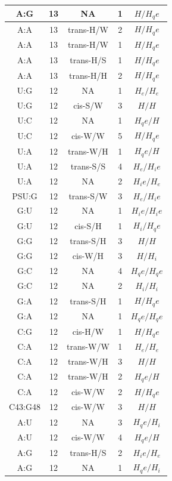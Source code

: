 \begin{center}
\begin{longtable}{c|c|c|c|c}
A:G & 13 & NA & 1 & $H/H_qe$ \\  \hline
A:A & 13 & trans-H/W & 2 & $H/H_qe$ \\  \hline
A:A & 13 & trans-H/W & 1 & $H/H_qe$ \\  \hline
A:A & 13 & trans-H/S & 1 & $H/H_qe$ \\  \hline
A:A & 13 & trans-H/H & 2 & $H/H_qe$ \\  \hline
U:G & 12 & NA & 1 & $H_e/H_e$ \\  \hline
U:G & 12 & cis-S/W & 3 & $H/H$ \\  \hline
U:C & 12 & NA & 1 & $H_qe/H$ \\  \hline
U:C & 12 & cis-W/W & 5 & $H/H_qe$ \\  \hline
U:A & 12 & trans-W/H & 1 & $H_qe/H$ \\  \hline
U:A & 12 & trans-S/S & 4 & $H_e/H_ie$ \\  \hline
U:A & 12 & NA & 2 & $H_ie/H_e$ \\  \hline
PSU:G & 12 & trans-S/W & 3 & $H_e/H_ie$ \\  \hline
G:U & 12 & NA & 1 & $H_ie/H_ie$ \\  \hline
G:U & 12 & cis-S/H & 1 & $H_i/H_qe$ \\  \hline
G:G & 12 & trans-S/H & 3 & $H/H$ \\  \hline
G:G & 12 & cis-W/H & 3 & $H/H_i$ \\  \hline
G:C & 12 & NA & 4 & $H_qe/H_qe$ \\  \hline
G:C & 12 & NA & 2 & $H_i/H_i$ \\  \hline
G:A & 12 & trans-S/H & 1 & $H/H_qe$ \\  \hline
G:A & 12 & NA & 1 & $H_qe/H_qe$ \\  \hline
C:G & 12 & cis-H/W & 1 & $H/H_qe$ \\  \hline
C:A & 12 & trans-W/W & 1 & $H_e/H_e$ \\  \hline
C:A & 12 & trans-W/H & 3 & $H/H$ \\  \hline
C:A & 12 & trans-W/H & 2 & $H_qe/H$ \\  \hline
C:A & 12 & cis-W/W & 2 & $H/H_qe$ \\  \hline
C43:G48 & 12 & cis-W/W & 3 & $H/H$ \\  \hline
A:U & 12 & NA & 3 & $H_qe/H_i$ \\  \hline
A:U & 12 & cis-W/W & 4 & $H_qe/H$ \\  \hline
A:G & 12 & trans-H/S & 2 & $H_ie/H_e$ \\  \hline
A:G & 12 & NA & 1 & $H_qe/H_i$ \\  \hline

\end{longtable}
\end{center}
